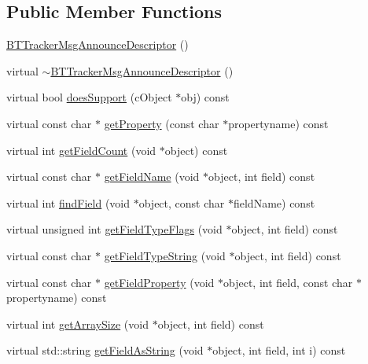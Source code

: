 \subsection*{Public Member Functions}
\begin{DoxyCompactItemize}
\item 
\hyperlink{classBTTrackerMsgAnnounceDescriptor_ad9f6b2850a773b895519e9e1b5734b71}{B\+T\+Tracker\+Msg\+Announce\+Descriptor} ()
\item 
virtual \hyperlink{classBTTrackerMsgAnnounceDescriptor_ac35bdcd4c78dc7437bf1d6fe36deb300}{$\sim$\+B\+T\+Tracker\+Msg\+Announce\+Descriptor} ()
\item 
virtual bool \hyperlink{classBTTrackerMsgAnnounceDescriptor_ac86d66fea47ff2c466debae97dcdba00}{does\+Support} (c\+Object $\ast$obj) const 
\item 
virtual const char $\ast$ \hyperlink{classBTTrackerMsgAnnounceDescriptor_a18bcff9a777c074d3ab809c36d177678}{get\+Property} (const char $\ast$propertyname) const 
\item 
virtual int \hyperlink{classBTTrackerMsgAnnounceDescriptor_a5b4826d0b804f7fca1d144e8054403ec}{get\+Field\+Count} (void $\ast$object) const 
\item 
virtual const char $\ast$ \hyperlink{classBTTrackerMsgAnnounceDescriptor_a29addafdc451299dc8371c80269cd698}{get\+Field\+Name} (void $\ast$object, int field) const 
\item 
virtual int \hyperlink{classBTTrackerMsgAnnounceDescriptor_a17f8f695be175fe96b2c6d435bf2ab79}{find\+Field} (void $\ast$object, const char $\ast$field\+Name) const 
\item 
virtual unsigned int \hyperlink{classBTTrackerMsgAnnounceDescriptor_ab7c550be8a336bdaaf69186890501917}{get\+Field\+Type\+Flags} (void $\ast$object, int field) const 
\item 
virtual const char $\ast$ \hyperlink{classBTTrackerMsgAnnounceDescriptor_ae0dcd1e9b8855a3e2533fc21544df7a4}{get\+Field\+Type\+String} (void $\ast$object, int field) const 
\item 
virtual const char $\ast$ \hyperlink{classBTTrackerMsgAnnounceDescriptor_aae8b37cb70a1704dd2ebd1788d9f3ae9}{get\+Field\+Property} (void $\ast$object, int field, const char $\ast$propertyname) const 
\item 
virtual int \hyperlink{classBTTrackerMsgAnnounceDescriptor_a45a1e926204bddea7be6c2254364361a}{get\+Array\+Size} (void $\ast$object, int field) const 
\item 
virtual std\+::string \hyperlink{classBTTrackerMsgAnnounceDescriptor_a729bb5bb71441aee3efff6fe2ba920b5}{get\+Field\+As\+String} (void $\ast$object, int field, int i) const 

\end{DoxyCompactItemize}

